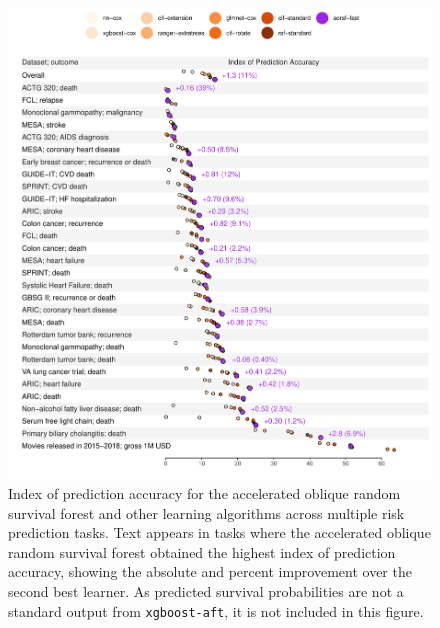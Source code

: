 \documentclass[twoside,11pt]{article}\usepackage[]{graphicx}\usepackage[]{xcolor}
\makeatletter
\def\maxwidth{ %
  \ifdim\Gin@nat@width>\linewidth
    \linewidth
  \else
    \Gin@nat@width
  \fi
}
\newenvironment{knitrout}{}{} %
\makeatother
\begin{document}
\begin{knitrout}
\color{fgcolor}\begin{figure}
\includegraphics[width=\maxwidth]{figure/bm_pred_viz_ibs-1} \caption[Index of prediction accuracy for the accelerated oblique random survival forest and other learning algorithms across multiple risk prediction tasks]{Index of prediction accuracy for the accelerated oblique random survival forest and other learning algorithms across multiple risk prediction tasks. Text appears in tasks where the accelerated oblique random survival forest obtained the highest index of prediction accuracy, showing the absolute and percent improvement over the second best learner. As predicted survival probabilities are not a standard output from \texttt{xgboost-aft}, it is not included in this figure.}\label{fig:bm_pred_viz_ibs}
\end{figure}

\end{knitrout}
\end{document}
